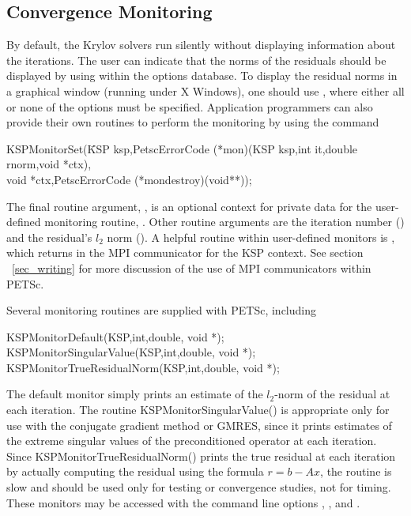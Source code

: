 \subsection{Convergence Monitoring}
\label{sec_kspmonitor}

By default, the Krylov solvers run silently without displaying information 
about the iterations. The user can indicate that the norms of the residuals 
should be displayed by using 
 within the options database.  
To display the residual norms in a graphical window (running under X Windows),
one should use  \trl{[x,y,w,h]}, where either all or none of 
the options must be specified. 
Application programmers can also provide their own routines to perform 
the monitoring by using the command 
\begin{tabbing}
  KSPMonitorSet(\=KSP ksp,PetscErrorCode (*mon)(KSP ksp,int it,double rnorm,void *ctx),\\
                \>        void *ctx,PetscErrorCode (*mondestroy)(void**));
\end{tabbing}
The final routine argument, , is an optional context for private
data for the user-defined monitoring routine, .  Other
 routine arguments are the iteration
number () and the residual's $ l_2 $ norm ().
A helpful routine within user-defined monitors is 
, which returns
in   the
MPI communicator for the KSP context.  See section ~\ref{sec_writing}
for more discussion of the use of MPI communicators within PETSc.

Several monitoring routines are supplied with PETSc, 
including 
\begin{tabbing}
  KSPMonitorDefault(KSP,int,double, void *);\\
  KSPMonitorSingularValue(KSP,int,double, void *);\\
  KSPMonitorTrueResidualNorm(KSP,int,double, void *);
\end{tabbing}
The default monitor simply prints an estimate of the $l_2$-norm of the 
residual at each iteration. The routine
KSPMonitorSingularValue() is appropriate only for use with the conjugate 
gradient method or GMRES, since it prints estimates of the extreme singular 
values of the preconditioned operator at each iteration. Since
KSPMonitorTrueResidualNorm() prints 
the true residual at each iteration by 
actually computing the residual using the formula $ r = b - Ax $, the routine
is slow and should be used only for testing or convergence studies,
not for timing. These monitors may be accessed with the command line options
, , and .
  

